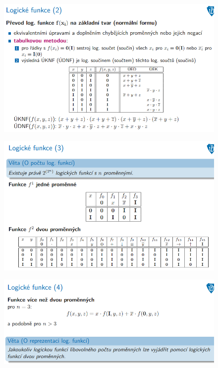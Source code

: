 \documentclass[10pt,a4paper]{article}
\begin{document}
\begin{figure} [h]
	\includegraphics[scale=0.65]{img/prvni_odstavec/otazka2/logicke_funkce2.png}	
\end{figure}

\begin{figure} [h]
	\includegraphics[scale=0.65]{img/prvni_odstavec/otazka2/logicke_funkce3.png}	
\end{figure}

\begin{figure} [h]
	\includegraphics[scale=0.65]{img/prvni_odstavec/otazka2/logicke_funkce4.png}	
\end{figure}
\end{document}
